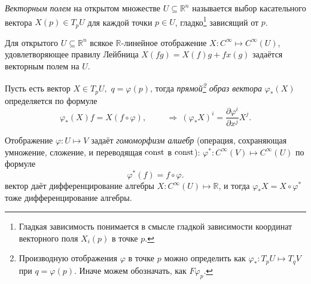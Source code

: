 
\begin{to_def} 
    \textit{Векторным полем} на открытом множестве $U \subseteq \mathbb{R}^n$ называется выбор касательного вектора $X(p) \in T_p U$ для каждой точки $p \in U$, гладко\footnote{
        Гладкая зависимость понимается в смысле гладкой зависимости координат векторного поля $X_i(p)$ в точке $p$.
    } зависящий от $p$.  
\end{to_def}


\begin{to_lem} 
    Для открытого $U \subseteq \mathbb{R}^n$ всякое $\mathbb{R}$-линейное отображение $X \colon C^{\infty} \mapsto C^{\infty}(U)$, удовлетворяющее правилу Лейбница $X(fg) = X(f) g + f x(g)$ задаётся векторным полем на $U$. 
\end{to_lem}



\begin{to_def} 
    Пусть есть вектор $X \in T_pU,$ $q = \varphi(p)$, тогда \textit{прямой\footnote{
        Производную отображения $\varphi$ в точке $p$ можно определить как $\varphi_*\colon T_p U \mapsto  T_q V$ при $q = \varphi(p)$. Иначе можем обозначать, как $F \varphi_p$.
    } образ вектора} $\varphi_*(X)$ определяется по формуле
    \begin{equation*}
        \varphi_* (X) f = X(f \circ \varphi),
        \hspace{1cm}\Rightarrow\  \left(\varphi_*X\right)^i = \frac{\partial \varphi^i}{\partial x^j} X^j.
    \end{equation*}
\end{to_def}

\begin{to_def} 
    Отображение $\varphi \colon U \mapsto  V$ задаёт \textit{гомоморфизм алшебр} (операция, сохраняющая умножение, сложение, и переводящая $\text{const}$ в $\text{const}$): 
    $\varphi^* \colon C^{\infty}(V) \mapsto C^{\infty}(U)$ по формуле
    \begin{equation*}
        \varphi^* (f) = f \circ \varphi.
    \end{equation*}
    вектор даёт дифференцирование алгебры $X \colon C^{\infty}(U) \mapsto \mathbb{R}$, и тогда $\varphi_* X = X \circ \varphi^*$ тоже дифференцирование алгебры. 
\end{to_def}

